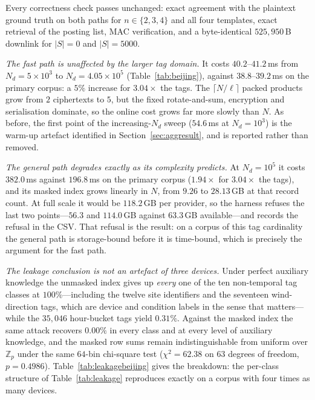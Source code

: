 \documentclass[journal]{IEEEtran}
\begin{document}
Every correctness check passes unchanged: exact agreement with the plaintext
ground truth on both paths for $n\in\{2,3,4\}$ and all four templates, exact
retrieval of the posting list, MAC verification, and a byte-identical
$525{,}950$\,B downlink for $|S|=0$ and $|S|=5000$.

\emph{The fast path is unaffected by the larger tag domain.} It costs
$40.2$--$41.2$\,ms from $N_d=5\times10^3$ to $N_d=4.05\times10^5$
(Table~\ref{tab:beijing}), against $38.8$--$39.2$\,ms on the primary corpus: a
$5\%$ increase for $3.04\times$ the tags. The $\lceil N/\ell\rceil$ packed
products grow from $2$ ciphertexts to $5$, but the fixed rotate-and-sum,
encryption and serialisation dominate, so the online cost grows far more slowly
than $N$. As before, the first point of the increasing-$N_d$ sweep
($54.6$\,ms at $N_d=10^3$) is the warm-up artefact identified in
Section~\ref{sec:aggresult}, and is reported rather than removed.

\emph{The general path degrades exactly as its complexity predicts.} At
$N_d=10^5$ it costs $382.0$\,ms against $196.8$\,ms on the primary corpus
($1.94\times$ for $3.04\times$ the tags), and its masked index grows linearly in
$N$, from $9.26$ to $28.13$\,GB at that record count. At full scale it would be
$118.2$\,GB per provider, so the harness refuses the last two points---$56.3$
and $114.0$\,GB against $63.3$\,GB available---and records the refusal in the
CSV. That refusal is the result: on a corpus of this tag cardinality the general
path is storage-bound before it is time-bound, which is precisely the argument
for the fast path.

\emph{The leakage conclusion is not an artefact of three devices.} Under perfect
auxiliary knowledge the unmasked index gives up \emph{every} one of the ten
non-temporal tag classes at $100\%$---including the twelve site identifiers and
the seventeen wind-direction tags, which are device and condition labels in the
sense that matters---while the $35{,}046$ hour-bucket tags yield $0.31\%$.
Against the masked index the same attack recovers $0.00\%$ in every class and at
every level of auxiliary knowledge, and the masked row sums remain
indistinguishable from uniform over $\mathbb{Z}_p$ under the same $64$-bin
chi-square test ($\chi^2=62.38$ on $63$ degrees of freedom, $p=0.4986$).
Table~\ref{tab:leakagebeijing} gives the breakdown: the per-class structure of
Table~\ref{tab:leakage} reproduces exactly on a corpus with four times as many
devices.
\end{document}
